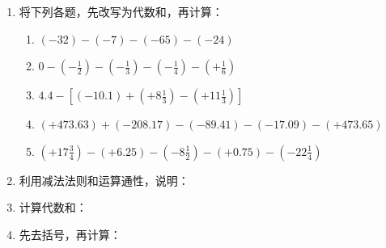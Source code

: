 \begin{enumerate}
\item 将下列各题，先改写为代数和，再计算：
\begin{enumerate}
    \item $(-32)-(-7)-(-65)-(-24)$
    \item $0-\left(-\frac{1}{2}\right)-\left(-\frac{1}{3}\right)-\left(-\frac{1}{4}\right)-\left(+\frac{1}{6}\right)$
    \item $4.4-\left[(-10.1)+\left(+8\frac{1}{3}\right)-\left(+11\frac{1}{3}\right)\right]$
    \item $(+473.63)+(-208.17)-(-89.41)-(-17.09)-(+473.65)$
    \item $\left(+17\frac{3}{4}\right)-(+6.25)-\left(-8\frac{1}{2}\right)-(+0.75)-\left(-22\frac{1}{4}\right)$
\end{enumerate}
\item 利用减法法则和运算通性，说明：
\begin{enumerate}
 
\end{enumerate}
\item 计算代数和：
\begin{enumerate}
\end{enumerate}

\item 
先去括号，再计算：
\begin{enumerate}
\end{enumerate}


\end{enumerate}
